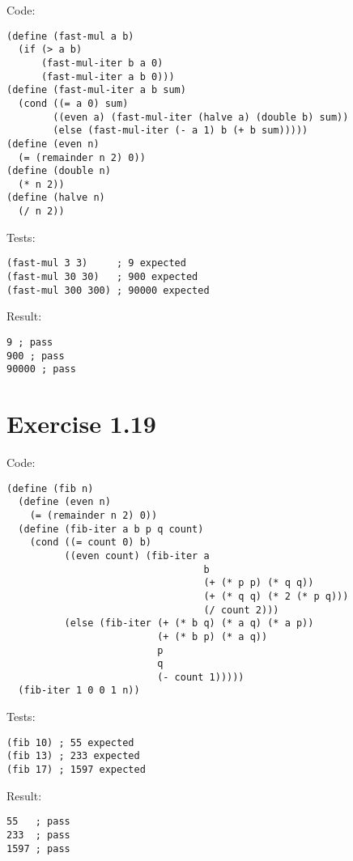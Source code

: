 \documentclass[../main.tex]{subfiles}
\begin{document}
Code:

\begin{lstlisting}
(define (fast-mul a b)
  (if (> a b)
      (fast-mul-iter b a 0)
      (fast-mul-iter a b 0)))
(define (fast-mul-iter a b sum)
  (cond ((= a 0) sum)
        ((even a) (fast-mul-iter (halve a) (double b) sum))
        (else (fast-mul-iter (- a 1) b (+ b sum)))))
(define (even n)
  (= (remainder n 2) 0))
(define (double n)
  (* n 2))
(define (halve n)
  (/ n 2))
\end{lstlisting}

Tests:

\begin{lstlisting}
(fast-mul 3 3)     ; 9 expected
(fast-mul 30 30)   ; 900 expected
(fast-mul 300 300) ; 90000 expected
\end{lstlisting}

Result:

\begin{lstlisting}
9 ; pass
900 ; pass
90000 ; pass
\end{lstlisting}

\section{Exercise 1.19}

Code:

\begin{lstlisting}
(define (fib n)
  (define (even n)
    (= (remainder n 2) 0))
  (define (fib-iter a b p q count)
    (cond ((= count 0) b)
          ((even count) (fib-iter a
                                  b
                                  (+ (* p p) (* q q))
                                  (+ (* q q) (* 2 (* p q)))
                                  (/ count 2)))
          (else (fib-iter (+ (* b q) (* a q) (* a p))
                          (+ (* b p) (* a q))
                          p
                          q
                          (- count 1)))))
  (fib-iter 1 0 0 1 n))
\end{lstlisting}

Tests:

\begin{lstlisting}
(fib 10) ; 55 expected
(fib 13) ; 233 expected
(fib 17) ; 1597 expected
\end{lstlisting}

Result:

\begin{lstlisting}
55   ; pass
233  ; pass
1597 ; pass
\end{lstlisting}
\end{document}
